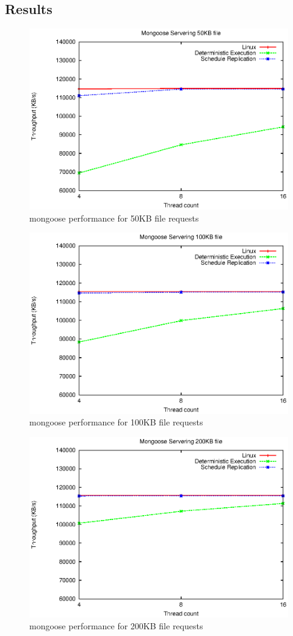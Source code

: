\subsection{Results}
\begin{figure}
\centering
\includegraphics[width=0.7\columnwidth]{figures/mg_throughput_50k}
\caption{mongoose performance for 50KB file requests}
\label{f:mg_50k}
\end{figure}
\begin{figure}
\centering
\includegraphics[width=0.7\columnwidth]{figures/mg_throughput_100k}
\caption{mongoose performance for 100KB file requests}
\label{f:mg_100k}
\end{figure}
\begin{figure}
\centering
\includegraphics[width=0.7\columnwidth]{figures/mg_throughput_200k}
\caption{mongoose performance for 200KB file requests}
\label{f:mg_200k}
\end{figure}

